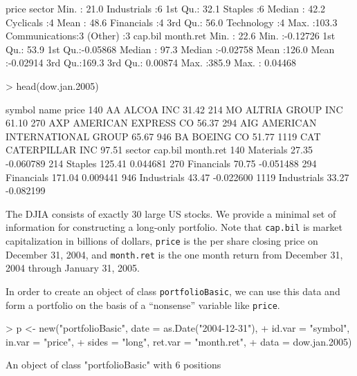 \documentclass[a4paper]{report}
\begin{document}
\begin{article}
\begin{Schunk}
\begin{Soutput}
                                      
     price                  sector 
 Min.   : 21.0   Industrials   :6  
 1st Qu.: 32.1   Staples       :6  
 Median : 42.2   Cyclicals     :4  
 Mean   : 48.6   Financials    :4  
 3rd Qu.: 56.0   Technology    :4  
 Max.   :103.3   Communications:3  
                 (Other)       :3  
    cap.bil        month.ret       
 Min.   : 22.6   Min.   :-0.12726  
 1st Qu.: 53.9   1st Qu.:-0.05868  
 Median : 97.3   Median :-0.02758  
 Mean   :126.0   Mean   :-0.02914  
 3rd Qu.:169.3   3rd Qu.: 0.00874  
 Max.   :385.9   Max.   : 0.04468  
\end{Soutput}
\begin{Sinput}
> head(dow.jan.2005)
\end{Sinput}
\begin{Soutput}
     symbol                         name price
140      AA                    ALCOA INC 31.42
214      MO             ALTRIA GROUP INC 61.10
270     AXP          AMERICAN EXPRESS CO 56.37
294     AIG AMERICAN INTERNATIONAL GROUP 65.67
946      BA                    BOEING CO 51.77
1119    CAT              CATERPILLAR INC 97.51
          sector cap.bil month.ret
140    Materials   27.35 -0.060789
214      Staples  125.41  0.044681
270   Financials   70.75 -0.051488
294   Financials  171.04  0.009441
946  Industrials   43.47 -0.022600
1119 Industrials   33.27 -0.082199
\end{Soutput}
\end{Schunk}

The DJIA consists of exactly 30 large US stocks. We provide a minimal
set of information for constructing a long-only portfolio. Note that
\texttt{cap.bil} is market capitalization in billions of dollars,
\texttt{price} is the per share closing price on December 31, 2004,
and \texttt{month.ret} is the one month return from December 31, 2004
through January 31, 2005.

In order to create an object of class \texttt{portfolioBasic}, we can
use this data and form a portfolio on the basis of a ``nonsense''
variable like \texttt{price}.


\begin{Schunk}
\begin{Sinput}
> p <- new("portfolioBasic", date = as.Date("2004-12-31"), 
+     id.var = "symbol", in.var = "price", 
+     sides = "long", ret.var = "month.ret", 
+     data = dow.jan.2005)
\end{Sinput}
\begin{Soutput}
An object of class "portfolioBasic" with 6 positions


\end{Soutput}
\end{Schunk}
\end{article}
\end{document}
